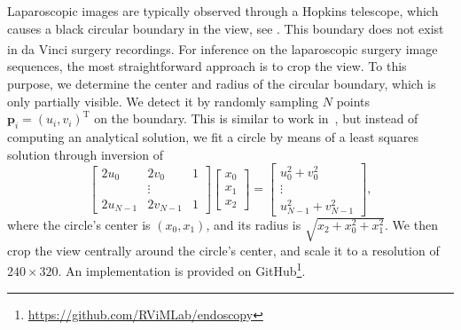 Laparoscopic images are typically observed through a Hopkins telescope, which causes a black circular boundary in the view, see . This boundary does not exist in da Vinci\textsuperscript{\textregistered} surgery recordings. For inference on the laparoscopic surgery image sequences, the most straightforward approach is to crop the view. To this purpose, we determine the center and radius of the circular boundary, which is only partially visible. We detect it by randomly sampling $N$ points $\mathbf{p}_i = (u_i,v_i)^\text{T}$ on the boundary. This is similar to work in~\cite{munzer2013detection}, but instead of computing an analytical solution, we fit a circle by means of a least squares solution through inversion of
\begin{equation}
    \begin{bmatrix}
        2u_0     & 2v_0     & 1 \\
                 & \vdots   & \\
        2u_{N-1} & 2v_{N-1} & 1
    \end{bmatrix}
    \begin{bmatrix}
        x_0 \\ x_1 \\ x_2
    \end{bmatrix} = 
    \begin{bmatrix}
        u_0^2 + v_0^2 \\
        \vdots        \\
        u_{N-1}^2 + v_{N-1}^2
    \end{bmatrix},
\end{equation}
where the circle's center is $(x_0, x_1)$, and its radius is $\sqrt{x_2 + x^2_0 + x^2_1}$. We then crop the view centrally around the circle's center, and scale it to a resolution of $240\times320$. An implementation is provided on GitHub\footnote[2]{\url{https://github.com/RViMLab/endoscopy}}.
